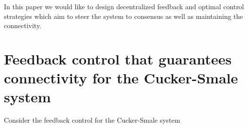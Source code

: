 \documentclass[a4paper,10pt, english]{article}
\begin{document}
In this paper we would like to design decentralized feedback and optimal control strategies which aim to steer the system to consensus as well as maintaining the connectivity.



































\newpage
\section{Feedback control that guarantees connectivity for the Cucker-Smale system}
Consider the feedback control for the Cucker-Smale system 
\end{document}
